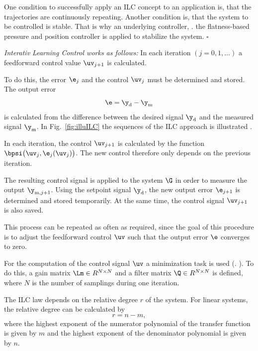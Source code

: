 \documentclass[conference]{IEEEtran}
\begin{document}
\begin{Remark}\label{rem:ILCrepeating}
  One condition to successfully apply an ILC concept to an application
  is, that the trajectories are continuously repeating. Another
  condition is, that the system to be controlled is stable. That is why
  an underlying controller, \eg. the flatness-based pressure and
  position controller is applied to stabilize the system. \hfill $\square$
\end{Remark}

\emph{Interativ Learning Control works as follows:} In each iteration
$\left(j=0,1,\ldots\right)$ a feedforward control value $\uv_{j+1}$ is
calculated.

To do this, the error $\e_j$ and the control $\uv_j$ must be
determined and stored.  The output error
\begin{equation}
	\label{eq:e_yd_ym}
	\e = \y_\mathrm{d} - \y_\mathrm{m}
\end{equation}
is calculated from the difference between the desired signal
$\y_\mathrm{d}$ and the measured signal $\y_\mathrm{m}$.  In
Fig.~\ref{fig:illuILC} the sequences of the ILC approach is
illustrated \cite{ILCGlueck2015}.

In each iteration, the control $\uv_{j+1}$ is calculated by the
function $\bpsi\bigl(\uv_j,\e_j(\uv_j)\bigr)$. The new control
therefore only depends on the previous iteration.

The resulting control signal is applied to the system $\G$ in order to
measure the output $\y_{\mathrm{m},j+1}$. Using the setpoint signal
$\y_\mathrm{d}$, the new output error $\e_{j+1}$ is determined and
stored temporarily. At the same time, the control signal $\uv_{j+1}$
is also saved.

This process can be repeated as often as required, since the goal of
this procedure is to adjust the feedforward control $\uv$ such that
the output error $\e$ converges to zero.

For the computation of the control signal $\uv$ a minimization task is
used (\cf. \cite{ILCGlueck2015}). To do this, a gain matrix
$\Lm \in R^{N \times N}$ and a filter matrix $\Q \in R^{N \times N}$
is defined, where $N$ is the number of samplings during one iteration.

The ILC law depends on the relative degree $r$ of the system.  For
linear systems, the relative degree can be calculated by
\begin{equation}\label{eq:r}
  r = n-m,
\end{equation}
where the highest exponent of the numerator polynomial of the transfer
function is given by $m$ and the highest exponent of the denominator
polynomial is given by $n$.
\end{document}
